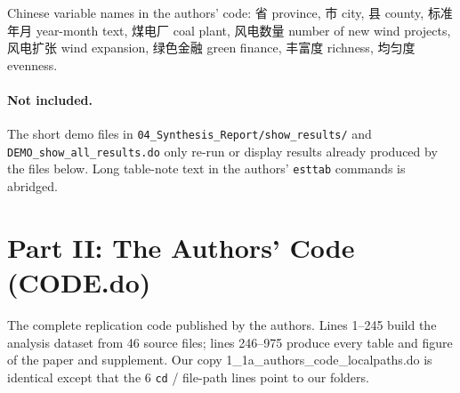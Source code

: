 \documentclass[10pt]{article}
\begin{document}
Chinese variable names in the authors' code: {\ttfamily 省} province, {\ttfamily 市} city, {\ttfamily 县} county, {\ttfamily 标准年月} year-month text, {\ttfamily 煤电厂} coal plant, {\ttfamily 风电数量} number of new wind projects, {\ttfamily 风电扩张} wind expansion, {\ttfamily 绿色金融} green finance, {\ttfamily 丰富度} richness, {\ttfamily 均匀度} evenness.

\paragraph{Not included.} The short demo files in \texttt{04\_Synthesis\_Report/show\_results/} and \texttt{DEMO\_show\_all\_results.do} only re-run or display results already produced by the files below. Long table-note text in the authors' \texttt{esttab} commands is abridged.
\section{Part II: The Authors' Code (CODE.do)}
The complete replication code published by the authors. Lines 1--245 build the analysis dataset from 46 source files; lines 246--975 produce every table and figure of the paper and supplement. Our copy 1\_1a\_authors\_code\_localpaths.do is identical except that the 6 \texttt{cd} / file-path lines point to our folders.
\end{document}
